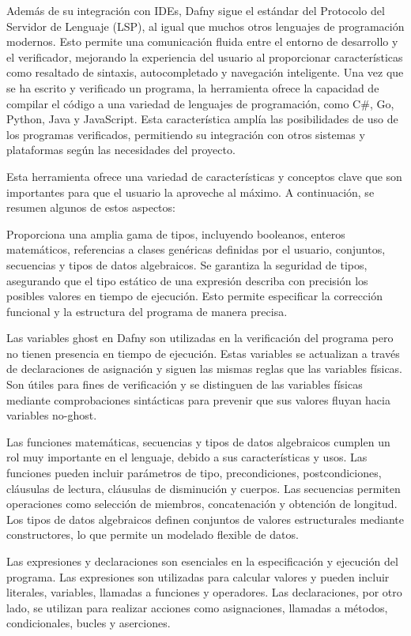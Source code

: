 \documentclass[runningheads]{llncs}
\begin{document}
Además de su integración con IDEs, Dafny sigue el estándar del Protocolo del Servidor de Lenguaje (LSP), al igual que muchos otros lenguajes de programación modernos.
Esto permite una comunicación fluida entre el entorno de desarrollo y el verificador, mejorando la experiencia del usuario al proporcionar características como resaltado de sintaxis, autocompletado y navegación inteligente.
Una vez que se ha escrito y verificado un programa, la herramienta ofrece la capacidad de compilar el código a una variedad de lenguajes de programación, como C\#, Go, Python, Java y JavaScript.
Esta característica amplía las posibilidades de uso de los programas verificados, permitiendo su integración con otros sistemas y plataformas según las necesidades del proyecto.

Esta herramienta ofrece una variedad de características y conceptos clave que son importantes para que el usuario la aproveche al máximo.
A continuación, se resumen algunos de estos aspectos:

Proporciona una amplia gama de tipos, incluyendo booleanos, enteros matemáticos, referencias a clases genéricas definidas por el usuario, conjuntos, secuencias y tipos de datos algebraicos.
Se garantiza la seguridad de tipos, asegurando que el tipo estático de una expresión describa con precisión los posibles valores en tiempo de ejecución.
Esto permite especificar la corrección funcional y la estructura del programa de manera precisa.

Las variables ghost en Dafny son utilizadas en la verificación del programa pero no tienen presencia en tiempo de ejecución.
Estas variables se actualizan a través de declaraciones de asignación y siguen las mismas reglas que las variables físicas.
Son útiles para fines de verificación y se distinguen de las variables físicas mediante comprobaciones sintácticas para prevenir que sus valores fluyan hacia variables no-ghost.

Las funciones matemáticas, secuencias y tipos de datos algebraicos cumplen un rol muy importante en el lenguaje, debido a sus características y usos.
Las funciones pueden incluir parámetros de tipo, precondiciones, postcondiciones, cláusulas de lectura, cláusulas de disminución y cuerpos.
Las secuencias permiten operaciones como selección de miembros, concatenación y obtención de longitud.
Los tipos de datos algebraicos definen conjuntos de valores estructurales mediante constructores, lo que permite un modelado flexible de datos.

Las expresiones y declaraciones son esenciales en la especificación y ejecución del programa.
Las expresiones son utilizadas para calcular valores y pueden incluir literales, variables, llamadas a funciones y operadores.
Las declaraciones, por otro lado, se utilizan para realizar acciones como asignaciones, llamadas a métodos, condicionales, bucles y aserciones.
\end{document}
